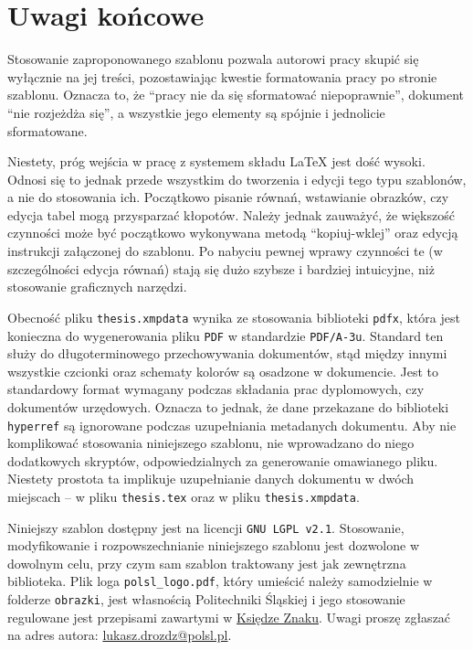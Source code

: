 \chapter{Uwagi końcowe}

Stosowanie zaproponowanego szablonu pozwala autorowi pracy skupić się wyłącznie na jej treści, pozostawiając kwestie formatowania pracy po stronie szablonu. Oznacza to, że \enquote{pracy nie da się sformatować niepoprawnie}, dokument \enquote{nie rozjeżdża się}, a wszystkie jego elementy są spójnie i jednolicie sformatowane.

Niestety, próg wejścia w pracę z systemem składu \LaTeX{} jest dość wysoki. Odnosi się to jednak przede wszystkim do tworzenia i edycji tego typu szablonów, a nie do stosowania ich. Początkowo pisanie równań, wstawianie obrazków, czy edycja tabel mogą przysparzać kłopotów. Należy jednak zauważyć, że większość czynności może być początkowo wykonywana metodą \enquote{kopiuj-wklej} oraz edycją instrukcji załączonej do szablonu. Po nabyciu pewnej wprawy czynności te (w szczególności edycja równań) stają się dużo szybsze i bardziej intuicyjne, niż stosowanie graficznych narzędzi.

Obecność pliku \texttt{thesis.xmpdata} wynika ze stosowania biblioteki \texttt{pdfx}, która jest konieczna do wygenerowania pliku \texttt{PDF} w standardzie \texttt{PDF/A-3u}. Standard ten służy do długoterminowego przechowywania dokumentów, stąd między innymi wszystkie czcionki oraz schematy kolorów są osadzone w dokumencie. Jest to standardowy format wymagany podczas składania prac dyplomowych, czy dokumentów urzędowych. Oznacza to jednak, że dane przekazane do biblioteki \texttt{hyperref} są ignorowane podczas uzupełniania metadanych dokumentu. Aby nie komplikować stosowania niniejszego szablonu, nie wprowadzano do niego dodatkowych skryptów, odpowiedzialnych za generowanie omawianego pliku. Niestety prostota ta implikuje uzupełnianie danych dokumentu w dwóch miejscach -- w pliku \texttt{thesis.tex} oraz w pliku \texttt{thesis.xmpdata}.

Niniejszy szablon dostępny jest na licencji \texttt{GNU LGPL v2.1}. Stosowanie, modyfikowanie i rozpowszechnianie niniejszego szablonu jest dozwolone w dowolnym celu, przy czym sam szablon traktowany jest jak zewnętrzna biblioteka. Plik loga \texttt{polsl\_logo.pdf}, który umieścić należy samodzielnie w folderze \texttt{obrazki}, jest własnością Politechniki Śląskiej i jego stosowanie regulowane jest przepisami zawartymi w \href{https://www.polsl.pl/siwps/logo-2/}{Księdze Znaku}. Uwagi proszę zgłaszać na adres autora: \href{mailto:lukasz.drozdz@polsl.pl}{lukasz.drozdz@polsl.pl}.
